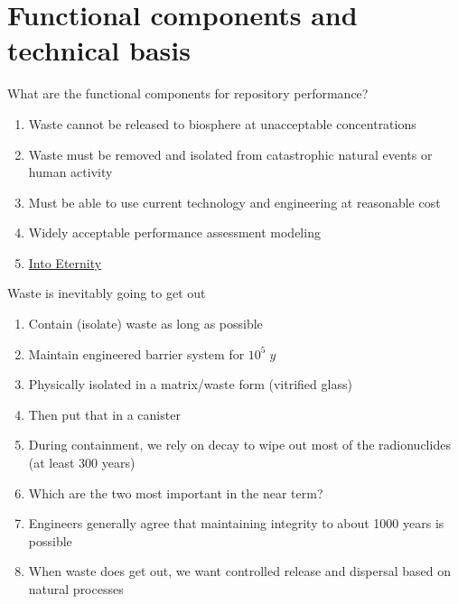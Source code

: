 \documentclass[aspectratio=1610,pdftex,dvipsnames,compress,xcolor={dvipsnames}]{beamer}
\begin{document}
\section{Functional components and technical basis}


\addtocounter{framenumber}{-1} 
\begin{frame}{What are the functional components for repository performance?}
    \begin{enumerate}[series=outerlist,topsep=0pt,itemsep=21pt,leftmargin=*,label=(\arabic*)]
        \item[]Waste cannot be released to biosphere at unacceptable concentrations
        \item[]Waste must be removed and isolated from catastrophic natural events or human activity
        \item[]Must be able to use current technology and engineering at reasonable cost
        \item[]Widely acceptable performance assessment modeling
        \item[]\href{https://youtu.be/ayLxB9fV2y4}{Into Eternity}
    \end{enumerate}
\end{frame}


\begin{frame}{Waste is inevitably going to get out}
    \begin{enumerate}[series=outerlist,topsep=0pt,itemsep=15pt,leftmargin=*,label=(\arabic*)]
        \item[]Contain (isolate) waste as long as possible
        \item[]Maintain engineered barrier system for $10^5 \; y$
        \item[]Physically isolated in a matrix/waste form (vitrified glass)
        \item[]Then put that in a canister
        \item[]During containment, we rely on decay to wipe out most of the radionuclides (at least 300 years)
        \item[]Which are the two most important in the near term?
        \item[]Engineers generally agree that maintaining integrity to about 1000 years is possible
        \item[]When waste does get out, we want controlled release and dispersal based on natural processes
    \end{enumerate}
\end{frame}
\end{document}
